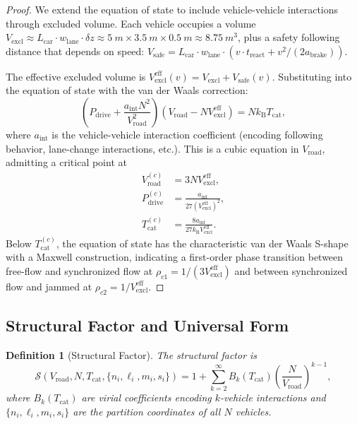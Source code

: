 \documentclass[twocolumn,10pt]{article}
\newtheorem{definition}[theorem]{Definition}
\newcommand{\kB}{k_{\mathrm{B}}}
\newcommand{\Tcat}{T_{\mathrm{cat}}}
\newcommand{\Pdrive}{P_{\mathrm{drive}}}
\newcommand{\Vroad}{V_{\mathrm{road}}}
\newcommand{\Vexcl}{V_{\mathrm{excl}}}
\begin{document}
\begin{proof}
We extend the equation of state to include vehicle-vehicle interactions through excluded volume. Each vehicle occupies a volume $\Vexcl \approx L_{\mathrm{car}} \cdot w_{\mathrm{lane}} \cdot \delta z \approx \SI{5}{m} \times \SI{3.5}{m} \times \SI{0.5}{m} \approx \SI{8.75}{m^3}$, plus a safety following distance that depends on speed: $V_{\mathrm{safe}} = L_{\mathrm{car}} \cdot w_{\mathrm{lane}} \cdot (v \cdot t_{\mathrm{react}} + v^2 / (2a_{\mathrm{brake}}))$.

The effective excluded volume is $\Vexcl^{\mathrm{eff}}(v) = \Vexcl + V_{\mathrm{safe}}(v)$. Substituting into the equation of state with the van der Waals correction:
\begin{equation}
\left(\Pdrive + \frac{a_{\mathrm{int}} N^2}{\Vroad^2}\right)\left(\Vroad - N \Vexcl^{\mathrm{eff}}\right) = N \kB \Tcat,
\end{equation}
where $a_{\mathrm{int}}$ is the vehicle-vehicle interaction coefficient (encoding following behavior, lane-change interactions, etc.). This is a cubic equation in $\Vroad$, admitting a critical point at
\begin{align}
\Vroad^{(c)} &= 3N\Vexcl^{\mathrm{eff}}, \\
\Pdrive^{(c)} &= \frac{a_{\mathrm{int}}}{27(\Vexcl^{\mathrm{eff}})^2}, \\
\Tcat^{(c)} &= \frac{8a_{\mathrm{int}}}{27\kB \Vexcl^{\mathrm{eff}}}.
\end{align}
Below $\Tcat^{(c)}$, the equation of state has the characteristic van der Waals S-shape with a Maxwell construction, indicating a first-order phase transition between free-flow and synchronized flow at $\rho_{c1} = 1/(3\Vexcl^{\mathrm{eff}})$ and between synchronized flow and jammed at $\rho_{c2} = 1/\Vexcl^{\mathrm{eff}}$.
\end{proof}

\subsection{Structural Factor and Universal Form}

\begin{definition}[Structural Factor]\label{def:structural}
The structural factor is
\begin{equation}\label{eq:structural}
\mathcal{S}(\Vroad, N, \Tcat, \{n_i, \ell_i, m_i, s_i\}) = 1 + \sum_{k=2}^{\infty} B_k(\Tcat) \left(\frac{N}{\Vroad}\right)^{k-1},
\end{equation}
where $B_k(\Tcat)$ are virial coefficients encoding $k$-vehicle interactions and $\{n_i, \ell_i, m_i, s_i\}$ are the partition coordinates of all $N$ vehicles.
\end{definition}
\end{document}
